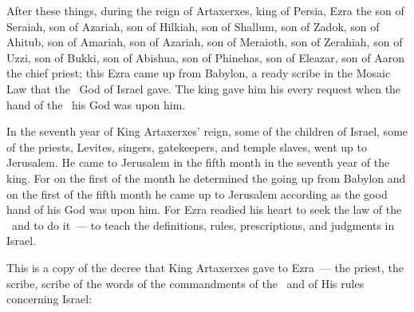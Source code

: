 
\begin{inparaenum}
   After these things, during the reign of Artaxerxes, king of Persia, Ezra the son of Seraiah, son of Azariah, son of Hilkiah,%
   son of Shallum, son of Zadok, son of Ahitub,%
   son of Amariah, son of Azariah, son of Meraioth,%
   son of Zerahiah, son of Uzzi, son of Bukki,%
   son of Abishua, son of Phinehas, son of Eleazar, son of Aaron the chief priest;%
   this Ezra came up from Babylon, a ready scribe in the Mosaic Law that the \lord\ God of Israel gave. The king gave him his every request when the hand of the \lord\ his God was upon him.%
  
   In the seventh year of King Artaxerxes' reign, some of the children of Israel, some of the priests, Levites, singers, gatekeepers, and temple slaves, went up to Jerusalem.%
   He came to Jerusalem in the fifth month in the seventh year of the king.%
   For on the first of the month he determined the going up from Babylon and on the first of the fifth month he came up to Jerusalem according as the good hand of his God was upon him.%
   For Ezra readied his heart to seek the law of the \lord\ and to do it~--- to teach the definitions, rules, prescriptions, and judgments in Israel.%
  
   This is a copy of the decree that King Artaxerxes gave to Ezra~--- the priest, the scribe, scribe of the words of the commandments of the \lord\ and of His rules concerning Israel:%
\end{inparaenum}
